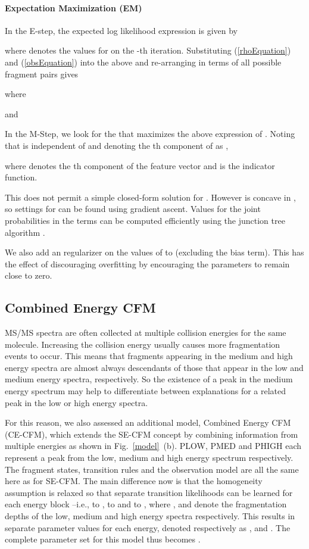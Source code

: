\paragraph{Expectation Maximization (EM)}

In the E-step, the expected log likelihood expression is given by

where  denotes the values for  on the -th iteration. Substituting (\ref{rhoEquation}) and (\ref{obsEquation}) into the above and re-arranging in terms of all possible fragment pairs gives

where 


and


In the M-Step, we look for the  that maximizes the above expression of . Noting that  is independent of  and denoting the th component of  as , 

where  denotes the th component of the feature vector  and  is the indicator function.

This does not permit a simple closed-form solution for . However   is concave in , so settings for  can be found using gradient ascent. 
Values for the joint probabilities in the  terms can be computed efficiently using the junction tree algorithm \citep{Koller2009}. 

We also add an  regularizer on the values of  to  (excluding the bias term). 
This has the effect of discouraging overfitting by encouraging the parameters to remain close to zero.

\subsection{Combined Energy CFM}
\label{CombinedEnergyModel}

MS/MS spectra are often collected at multiple collision energies for the same molecule. 
Increasing the collision energy usually causes more fragmentation events to occur.
This means that fragments appearing in the medium and high energy spectra are almost always descendants 
of those that appear in the low and medium energy spectra, respectively.
So the existence of a peak in the medium energy spectrum may help to differentiate between explanations for a related peak in the low or high energy spectra. 

For this reason, we also assessed an additional model, Combined Energy CFM (CE-CFM), which extends the SE-CFM concept by combining information from multiple energies as shown in Fig.~\ref{model}~(b). P{\tiny LOW}, P{\tiny MED} and P{\tiny HIGH} each represent a peak from the low, medium and high energy spectrum respectively.
The fragment states, transition rules and the observation model are all the same here as for SE-CFM. 
The main difference now is that the homogeneity assumption is relaxed so that separate transition likelihoods can be learned for each energy block --i.e.,  to ,  to  and  to , where ,  and   denote the fragmentation depths of the low, medium and high energy spectra respectively. This results in separate parameter values for each energy, denoted respectively as ,  and . 
The complete parameter set for this model thus becomes . 

